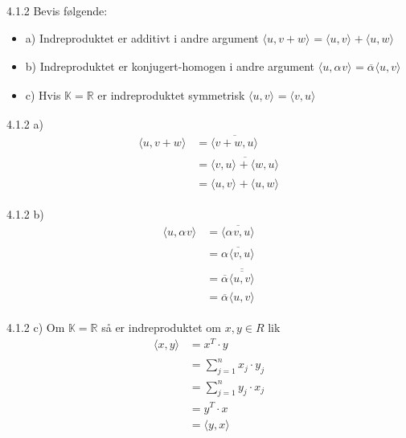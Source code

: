 \documentclass[a4paper,norsk]{article}
\begin{document}
\begin{oppgavebox}{4.1.2}{}
Bevis følgende:
\begin{itemize}
    \item a) Indreproduktet er additivt i andre argument $ \langle u, v + w \rangle_{  } = \langle u, v \rangle_{  } + \langle u, w \rangle_{  }  $ 
    \item b) Indreproduktet er konjugert-homogen i andre argument $ \langle u, \alpha_{}^{} v \rangle_{  } = \overline{\alpha_{}^{} } \langle u, v \rangle_{  }  $ 
    \item c) Hvis $ \mathbb{K}=\mathbb{R} $ er indreproduktet symmetrisk $ \langle u, v \rangle_{  } = \langle v, u \rangle_{  }  $ 
\end{itemize}

\begin{proofbox}{4.1.2 a)}{}
\begin{align*}
    \langle u, v+ w \rangle_{  } &= \overline{ \langle v+w, u \rangle_{  } } \\
    &= \overline{ \langle v, u \rangle_{  }  + \langle w, u \rangle_{  } }\\
    &= \langle u, v \rangle_{  } + \langle u, w \rangle_{  } 
\end{align*}
\end{proofbox}

\begin{proofbox}{4.1.2 b)}{}
\begin{align*}
    \langle u, \alpha_{}^{} v \rangle_{  } &= \overline{ \langle \alpha_{}^{} v, u \rangle_{  } } \\
    &= \overline{ \alpha_{}^{}  \langle v, u \rangle_{  } } \\
    &= \overline{\alpha_{}^{} } \overline{ \overline{ \langle u, v \rangle_{  } }} \\
    &= \overline{\alpha_{}^{} } \langle u, v \rangle_{  } 
\end{align*}
\end{proofbox}

\begin{proofbox}{4.1.2 c)}{}
Om $ \mathbb{K} = \mathbb{R} $ så er indreproduktet om $ x, y \in R $ lik
\begin{align*}
    \langle x,y \rangle_{  } &= x^T\cdot y\\
    &= \sum_{ j=1 }^{ n } x_j \cdot y_j \\
    &= \sum_{ j=1 }^{ n } y_j \cdot x_j \\
    &= y^T \cdot x \\
    &= \langle y, x \rangle_{  } 
\end{align*}
\end{proofbox}
\end{oppgavebox}
\end{document}
